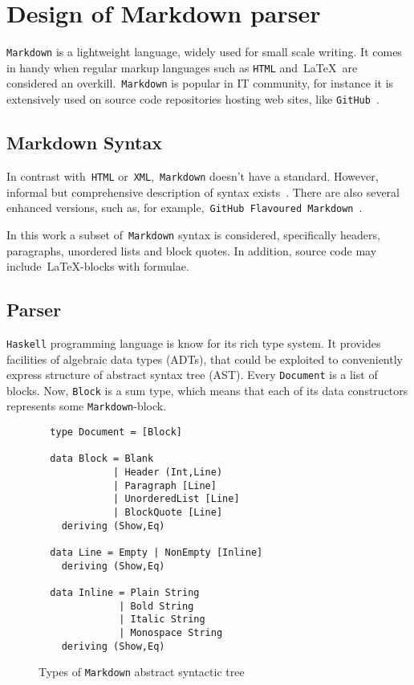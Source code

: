 
\chapter{Design of Markdown parser}

\lstinline{Markdown} is a lightweight language, widely used for small scale 
writing. It comes in handy when regular markup languages such as 
\lstinline{HTML} and~\LaTeX~are considered an overkill.~\lstinline{Markdown}
is popular in IT community, for instance it is extensively used on source code 
repositories hosting web sites, like \lstinline{GitHub}~\cite{github}.

\section{Markdown Syntax}

  In contrast with~\lstinline{HTML} or~\lstinline{XML},~\lstinline{Markdown}
  doesn't have a standard. However, informal but comprehensive description of 
  syntax exists~\cite{markdownSyntax}. There are also several enhanced versions, 
  such as, for example,~\lstinline{GitHub Flavoured Markdown}~\cite{GFM}.

  In this work a subset of~\lstinline{Markdown} syntax is considered, 
  specifically headers, paragraphs, unordered lists and block quotes. In addition, 
  source code may include~\LaTeX-blocks with formulae.   

\section{Parser}

  \lstinline{Haskell} programming language is know for its rich type system. 
  It provides facilities of algebraic data types (ADTs), that could be exploited 
  to conveniently express structure of abstract syntax tree (AST). Every 
  \lstinline{Document} is a list of blocks. Now, \lstinline{Block} is a sum type, 
  which means that each of its data constructors represents some 
  \lstinline{Markdown}-block.     

  \begin{figure}[t]
  \begin{lstlisting}
  type Document = [Block]

  data Block = Blank
             | Header (Int,Line)
             | Paragraph [Line]
             | UnorderedList [Line]
             | BlockQuote [Line]
    deriving (Show,Eq)

  data Line = Empty | NonEmpty [Inline]
    deriving (Show,Eq)

  data Inline = Plain String
              | Bold String
              | Italic String
              | Monospace String
    deriving (Show,Eq)
  \end{lstlisting}
  \caption{Types of \lstinline{Markdown} abstract syntactic tree}
  \label{listing:MarkdownADT}
  \end{figure}

